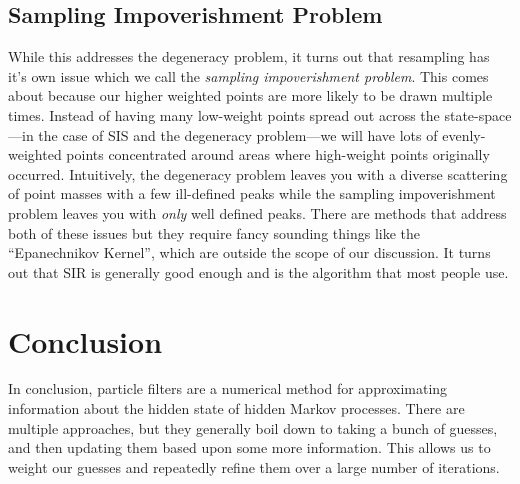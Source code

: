 \documentclass{article}
\begin{document}
\subsection{Sampling Impoverishment Problem}
While this addresses the degeneracy problem, it turns out that resampling has it's own issue which we call the \textit{sampling impoverishment problem}. This comes about because our higher weighted points are more likely to be drawn multiple times. Instead of having many low-weight points spread out across the state-space---in the case of SIS and the degeneracy problem---we will have lots of evenly-weighted points concentrated around areas where high-weight points originally occurred. Intuitively, the degeneracy problem leaves you with a diverse scattering of point masses with a few ill-defined peaks while the sampling impoverishment problem leaves you with \textit{only} well defined peaks. There are methods that address both of these issues but they require fancy sounding things like the ``Epanechnikov Kernel'', which are outside the scope of our discussion. It turns out that SIR is generally good enough and is the algorithm that most people use.

\FloatBarrier
\section{Conclusion}
In conclusion, particle filters are a numerical method for approximating information about the hidden state of hidden Markov processes. There are multiple approaches, but they generally boil down to taking a bunch of guesses, and then updating them based upon some more information. This allows us to weight our guesses and repeatedly refine them over a large number of iterations.

\newpage
\nocite{*}


\end{document}
